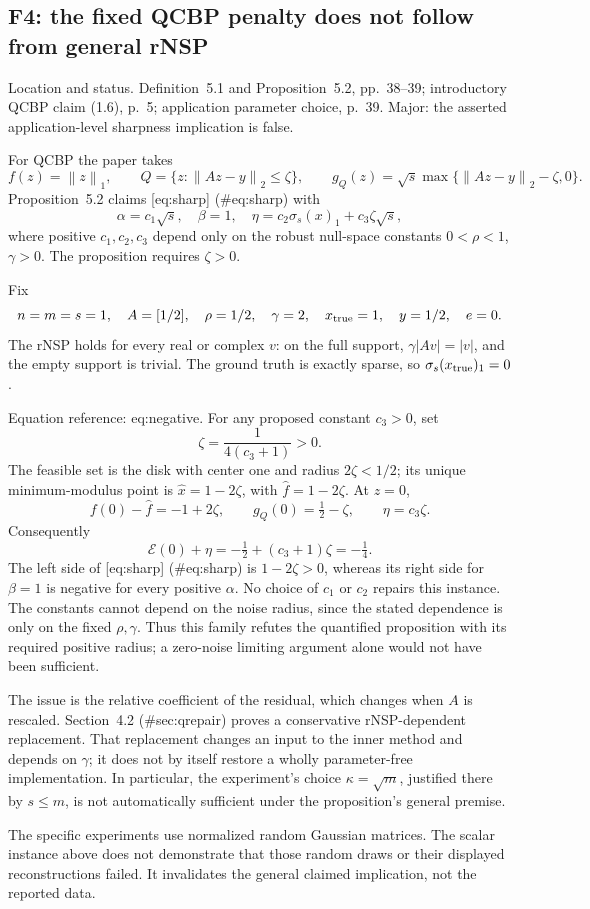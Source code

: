 \documentclass[10pt]{article}
\begin{document}
\subsection*{F4: the fixed QCBP penalty does not follow from general rNSP}
Location and status. Definition 5.1 and Proposition 5.2, pp. 38–39; introductory QCBP claim (1.6), p. 5; application parameter choice, p. 39. Major: the asserted application-level sharpness implication is false.\par
For QCBP the paper takes \[f(z)=\left\lVert z\right\rVert_1,\qquad
 Q=\{z:\left\lVert Az-y\right\rVert_2\le\zeta\},\qquad
 g_Q(z)=\sqrt{s}\max\{\left\lVert Az-y\right\rVert_2-\zeta,0\}.\] Proposition 5.2 claims [eq:sharp] (\#eq:sharp) with \[\alpha=c_1\sqrt{s},\quad \beta=1,\quad
 \eta=c_2\sigma_s(x)_1+c_3\zeta\sqrt{s},\] where positive \(c_1,c_2,c_3\) depend only on the robust null-space constants \(0<\rho<1\), \(\gamma>0\). The proposition requires \(\zeta>0\).\par
Fix \[n=m=s=1,\quad A=[1/2],\quad \rho=1/2,\quad\gamma=2,
 \quad x_{\rm true}=1,\quad y=1/2,\quad e=0.\] The rNSP holds for every real or complex \(v\): on the full support, \(\gamma|Av|=|v|\), and the empty support is trivial. The ground truth is exactly sparse, so \(\sigma_s(x_{\rm true})_1=0\).\par
Equation reference: eq:negative. For any proposed constant \(c_3>0\), set \[\zeta=\frac1{4(c_3+1)}>0.\] The feasible set is the disk with center one and radius \(2\zeta<1/2\); its unique minimum-modulus point is \(\widehat x=1-2\zeta\), with \(\widehat f=1-2\zeta\). At \(z=0\), \[f(0)-\widehat f=-1+2\zeta,\qquad
 g_Q(0)=\tfrac12-\zeta,\qquad
 \eta=c_3\zeta.\] Consequently \[
 \mathcal E(0)+\eta=-\tfrac12+(c_3+1)\zeta=-\tfrac14.\] The left side of [eq:sharp] (\#eq:sharp) is \(1-2\zeta>0\), whereas its right side for \(\beta=1\) is negative for every positive \(\alpha\). No choice of \(c_1\) or \(c_2\) repairs this instance. The constants cannot depend on the noise radius, since the stated dependence is only on the fixed \(\rho,\gamma\). Thus this family refutes the quantified proposition with its required positive radius; a zero-noise limiting argument alone would not have been sufficient.\par
The issue is the relative coefficient of the residual, which changes when \(A\) is rescaled. Section 4.2 (\#sec:qrepair) proves a conservative rNSP-dependent replacement. That replacement changes an input to the inner method and depends on \(\gamma\); it does not by itself restore a wholly parameter-free implementation. In particular, the experiment’s choice \(\kappa=\sqrt m\), justified there by \(s\le m\), is not automatically sufficient under the proposition’s general premise.\par
The specific experiments use normalized random Gaussian matrices. The scalar instance above does not demonstrate that those random draws or their displayed reconstructions failed. It invalidates the general claimed implication, not the reported data.\par
\end{document}
